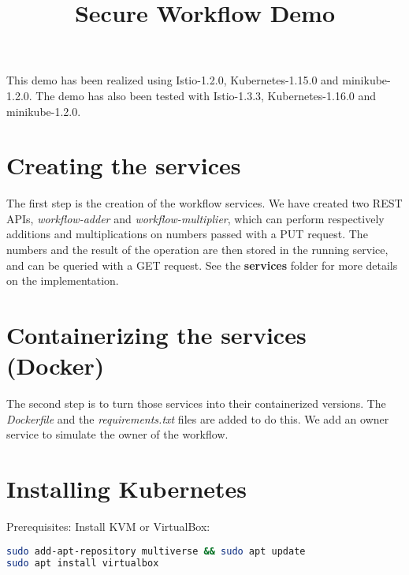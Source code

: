 \documentclass[12pt]{article}
\begin{document}
 
 
\title{Secure Workflow Demo}

\maketitle

This demo has been realized using Istio-1.2.0, Kubernetes-1.15.0 and minikube-1.2.0.
The demo has also been tested with Istio-1.3.3, Kubernetes-1.16.0 and minikube-1.2.0.

\section{Creating the services}

The first step is the creation of the workflow services.
We have created two REST APIs, \textit{workflow-adder} and \textit{workflow-multiplier}, which can perform respectively additions and multiplications on numbers passed with a PUT request.
The numbers and the result of the operation are then stored in the running service, and can be queried with a GET request.
See the \textbf{services} folder for more details on the implementation.

\section{Containerizing the services (Docker)}

The second step is to turn those services into their containerized versions.
The \textit{Dockerfile} and the \textit{requirements.txt} files are added to do this.
We add an owner service to simulate the owner of the workflow.



\section{Installing Kubernetes}

Prerequisites: Install KVM or VirtualBox:
\begin{lstlisting}[language=bash]
sudo add-apt-repository multiverse && sudo apt update
sudo apt install virtualbox
\end{lstlisting}
\end{document}
